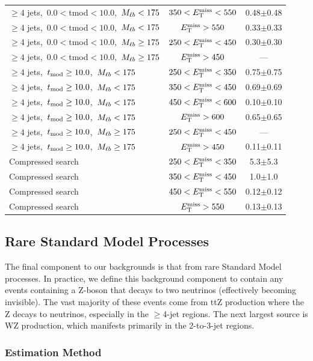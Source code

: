 \begin{table}[htbp]
\begin{tabular}{|l|c|c|}
$\ge4$ jets,~$0.0<$tmod$<10.0$,~$M_{\ell b} <175$ & $350<E_\text{T}^\text{miss}<550$ &  0.48$\pm$0.48  \\
$\ge4$ jets,~$0.0<$tmod$<10.0$,~$M_{\ell b} <175$ & $E_\text{T}^\text{miss}>550$     &  0.33$\pm$0.33  \\
\hline
$\ge4$ jets,~$0.0<$tmod$<10.0$,~$M_{\ell b} \ge175$ & $250<E_\text{T}^\text{miss}<450$ &  0.30$\pm$0.30  \\
$\ge4$ jets,~$0.0<$tmod$<10.0$,~$M_{\ell b} \ge175$ & $E_\text{T}^\text{miss}>450$     &  ---  \\
\hline
$\ge4$ jets,~$t_\text{mod} \ge10.0$,~$M_{\ell b} <175$ & $250<E_\text{T}^\text{miss}<350$ &  0.75$\pm$0.75  \\
$\ge4$ jets,~$t_\text{mod} \ge10.0$,~$M_{\ell b} <175$ & $350<E_\text{T}^\text{miss}<450$ &  0.69$\pm$0.69  \\
$\ge4$ jets,~$t_\text{mod} \ge10.0$,~$M_{\ell b} <175$ & $450<E_\text{T}^\text{miss}<600$ &  0.10$\pm$0.10 \\
$\ge4$ jets,~$t_\text{mod} \ge10.0$,~$M_{\ell b} <175$ & $E_\text{T}^\text{miss}>600$     &  0.65$\pm$0.65  \\
\hline
$\ge4$ jets,~$t_\text{mod} \ge10.0$,~$M_{\ell b} \ge175$ & $250<E_\text{T}^\text{miss}<450$ &  ---  \\
$\ge4$ jets,~$t_\text{mod} \ge10.0$,~$M_{\ell b} \ge175$ & $E_\text{T}^\text{miss}>450$     &  0.11$\pm$0.11 \\
\hline
Compressed search & $250<E_\text{T}^\text{miss}<350$ & 5.3$\pm$5.3 \\
Compressed search & $350<E_\text{T}^\text{miss}<450$ & 1.0$\pm$1.0 \\
Compressed search & $450<E_\text{T}^\text{miss}<550$ & 0.12$\pm$0.12 \\
Compressed search & $E_\text{T}^\text{miss}>550$     & 0.13$\pm$0.13 \\
\hline
\end{tabular}
\end{table}

\subsection{Rare Standard Model Processes}
\label{ssec:stop:rarebkg}

The final component to our backgrounds is that from
rare Standard Model processes. In practice, we define this background
component to contain any events containing a Z-boson that decays to
two neutrinos (effectively becoming invisible). The vast majority of
these events come from ttZ production where the Z decays to
neutrinos, especially in the $\geq$4-jet regions. The next largest
source is WZ production, which manifests primarily in the 2-to-3-jet
regions.

\subsubsection{Estimation Method}
\label{sssec:stop:rarebkg:estimation}

